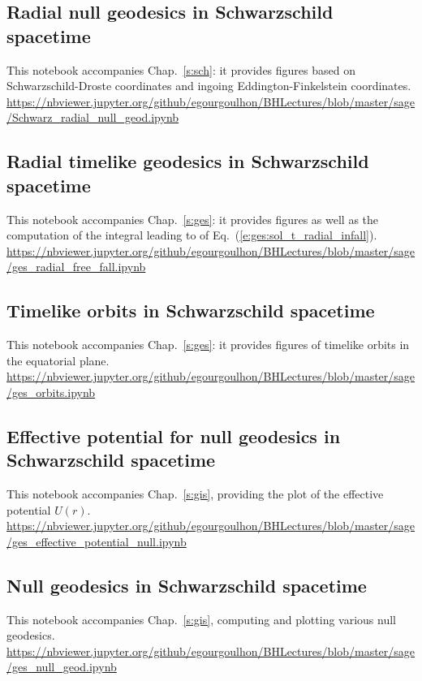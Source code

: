\subsection{Radial null geodesics in Schwarzschild spacetime}

This notebook accompanies Chap.~\ref{s:sch}: it provides figures based on
Schwarzschild-Droste coordinates and ingoing Eddington-Finkelstein coordinates.\\[1ex]
{\footnotesize
\url{https://nbviewer.jupyter.org/github/egourgoulhon/BHLectures/blob/master/sage/Schwarz_radial_null_geod.ipynb}
}

\subsection{Radial timelike geodesics in Schwarzschild spacetime} \label{s:sam:ges_radial_free_fall}

This notebook accompanies Chap.~\ref{s:ges}: it provides
figures as well as the computation of
the integral leading to
of Eq.~(\ref{e:ges:sol_t_radial_infall}).\\[1ex]
{\footnotesize
\url{https://nbviewer.jupyter.org/github/egourgoulhon/BHLectures/blob/master/sage/ges_radial_free_fall.ipynb}
}

\subsection{Timelike orbits in Schwarzschild spacetime} \label{s:sam:ges_orbits}
%
This notebook accompanies Chap.~\ref{s:ges}: it provides
figures of timelike orbits in the equatorial plane.\\[1ex]
{\footnotesize
\url{https://nbviewer.jupyter.org/github/egourgoulhon/BHLectures/blob/master/sage/ges_orbits.ipynb}
}

\subsection{Effective potential for null geodesics in Schwarzschild spacetime} \label{s:sam:ges_eff_pot_null}
%
This notebook accompanies Chap.~\ref{s:gis}, providing the plot of the
effective potential $U(r)$.\\[1ex]
{\footnotesize
\url{https://nbviewer.jupyter.org/github/egourgoulhon/BHLectures/blob/master/sage/ges_effective_potential_null.ipynb}
}

\subsection{Null geodesics in Schwarzschild spacetime} \label{s:sam:ges_null_geod}
%
This notebook accompanies Chap.~\ref{s:gis}, computing and plotting various
null geodesics.\\[1ex]
{\footnotesize
\url{https://nbviewer.jupyter.org/github/egourgoulhon/BHLectures/blob/master/sage/ges_null_geod.ipynb}
}

